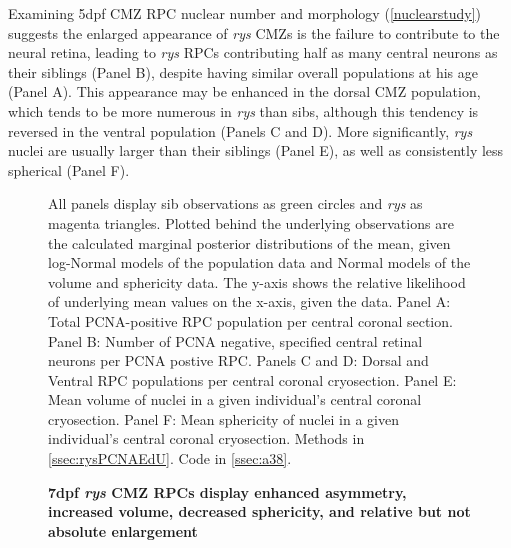 \documentclass{ut-thesis}
\begin{document}
\begin{NoHyper}
Examining 5dpf CMZ RPC nuclear number and morphology (\autoref{nuclearstudy}) suggests the enlarged appearance of \textit{rys} CMZs is the failure to contribute to the neural retina, leading to \textit{rys} RPCs contributing half as many central neurons as their siblings (Panel B), despite having similar overall populations at his age (Panel A). This appearance may be enhanced in the dorsal CMZ population, which tends to be more numerous in \textit{rys} than sibs, although this tendency is reversed in the ventral population (Panels C and D). More significantly, \textit{rys} nuclei are usually larger than their siblings (Panel E), as well as consistently less spherical (Panel F).

\begin{figure}[!h]
    \caption{{\bf 7dpf \textit{rys} CMZ RPCs display enhanced asymmetry, increased volume, decreased sphericity, and relative but not absolute enlargement}}
    \label{nuclearstudy}
    All panels display sib observations as green circles and \textit{rys} as magenta triangles. Plotted behind the underlying observations are the calculated marginal posterior distributions of the mean, given log-Normal models of the population data and Normal models of the volume and sphericity data. The y-axis shows the relative likelihood of underlying mean values on the x-axis, given the data.
    Panel A: Total PCNA-positive RPC population per central coronal section.
    Panel B: Number of PCNA negative, specified central retinal neurons per PCNA postive RPC.
    Panels C and D: Dorsal and Ventral RPC populations per central coronal cryosection.
    Panel E: Mean volume of nuclei in a given individual's central coronal cryosection.
    Panel F: Mean sphericity of nuclei in a given individual's central coronal cryosection.
    Methods in \autoref{ssec:rysPCNAEdU}.
    Code in \autoref{ssec:a38}.
\end{figure}


\end{NoHyper}
\end{document}
